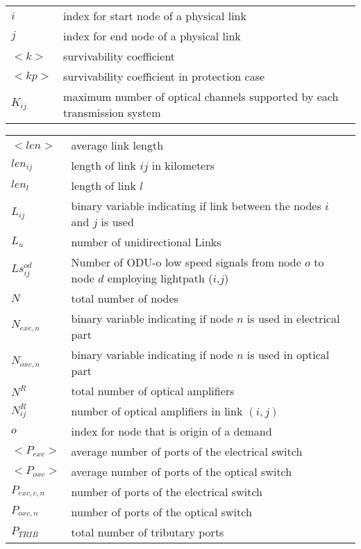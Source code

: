 \begin{table}[!ht]
\begin{tabular}{l p{}}
$i$ & index for start node of a physical link \\ [3mm]

$j$ & index for end node of a physical link \\ [3mm]

$<k>$ & survivability coefficient \\
$<kp>$ & survivability coefficient in protection case \\
$K_{ij}$ & maximum number of optical channels supported by each transmission system \\

	\end{tabular}	
\end{table}


\begin{table}[!ht]
\renewcommand{\arraystretch}{1.3}
	\flushright	
	\begin{tabular}{l p{}}
$<len>$ & average link length \\
$len_{ij}$ & length of link $ij$ in kilometers \\
$len_l$ & length of link $l$ \\
$L_{ij}$ & binary variable indicating if link between the nodes $i$ and $j$ is used \\
$L_u$ & number of unidirectional Links \\
$Ls_{ij}^{od}$ & Number of ODU-o low speed signals from node $o$ to node $d$ employing lightpath ($i$,$j$) \\[3mm]

$N$	& total number of nodes\\
$N_{exc,n}$	& binary variable indicating if node $n$ is used in electrical part \\
$N_{oxc,n}$	& binary variable indicating if node $n$ is used in optical part \\
$N^R$ & total number of optical amplifiers\\
$N^R_{ij}$ & number of optical amplifiers in link $(i,j)$\\ [3mm]

$o$ & index for node that is origin of a demand \\ [3mm]

$<P_{exc}>$ & average number of ports of the electrical switch \\
$<P_{oxc}>$ & average number of ports of the optical switch \\
$P_{exc,c,n}$ & number of ports of the electrical switch \\
$P_{oxc,n}$	& number of ports of the optical switch \\
$P_{TRIB}$ & total number of tributary ports \\[3mm]


\end{tabular}
\end{table}
